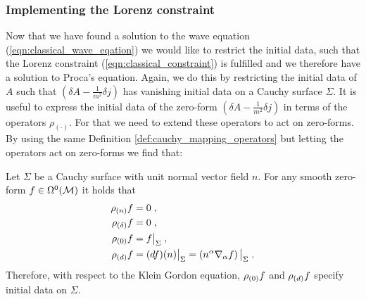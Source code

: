 \subsubsection{Implementing the Lorenz constraint}\vspace{-5mm}
Now that we have found a solution to the wave equation (\ref{eqn:classical_wave_eqation}) we would like to restrict the initial data, such that the Lorenz constraint (\ref{eqn:classical_constraint}) is fulfilled and we therefore have a solution to Proca's equation. Again, we do this by restricting the initial data of $A$ such that $(\delta A - \frac{1}{m^2} \delta j)$ has vanishing initial data on a Cauchy surface $\Sigma$. It is useful to express the initial data of the zero-form $(\delta A - \frac{1}{m^2} \delta j)$ in terms of the operators $\rho_{(\cdot)}$. For that we need to extend these operators to act on zero-forms. By using the same Definition \ref{def:cauchy_mapping_operators} but letting the operators act on zero-forms we find that:
\begin{lemma}\label{lem:klein_gordon_cauchy_data}
Let $\Sigma$ be a Cauchy surface with unit normal vector field $n$. For any smooth zero-form $f\in \Omega^0(\mathcal{M})$ it holds that
\begin{subequations}
\begin{align}
\rhon f &= 0 \formspace, \\
\rhodelta f &= 0 \formspace, \\
\rhoz f &= \restr{f}{\Sigma} \formspace, \\
\rhod f &= \restr{(df)(n)}{\Sigma} = \restr{\left(n^\alpha \nabla_\alpha f\right)}{\Sigma} \formspace.
\end{align}
\end{subequations}
Therefore, with respect to the Klein Gordon equation, $\rho_{(0)} f$ and $\rho_{(d)} f$ specify initial data on $\Sigma$.
\end{lemma}
%
